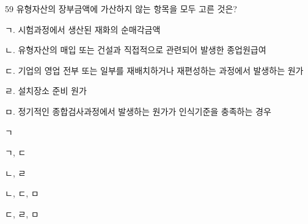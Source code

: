 \begin{question}{59}
유형자산의 장부금액에 가산하지 않는 항목을 모두 고른 것은?
\begin{framedtext}
ㄱ. 시험과정에서 생산된 재화의 순매각금액 \par
ㄴ. 유형자산의 매입 또는 건설과 직접적으로 관련되어 발생한 종업원급여 \par
ㄷ. 기업의 영업 전부 또는 일부를 재배치하거나 재편성하는 과정에서 발생하는 원가 \par
ㄹ. 설치장소 준비 원가 \par
ㅁ. 정기적인 종합검사과정에서 발생하는 원가가 인식기준을 충족하는 경우
\end{framedtext}
\begin{choices}
  \item ㄱ
  \item ㄱ, ㄷ
  \item ㄴ, ㄹ
  \item ㄴ, ㄷ, ㅁ
  \item ㄷ, ㄹ, ㅁ
\end{choices}
\end{question}
